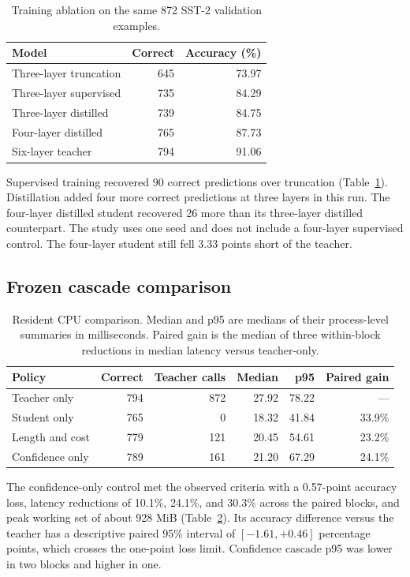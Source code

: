 \documentclass{article}
\begin{document}
\begin{table}[H]
\centering
\caption{Training ablation on the same 872 SST-2 validation examples.}
\label{tab:student}
\begin{tabular}{lrr}
\toprule Model & Correct & Accuracy (\%)\\
\midrule
Three-layer truncation & 645 & 73.97\\
Three-layer supervised & 735 & 84.29\\
Three-layer distilled & 739 & 84.75\\
Four-layer distilled & 765 & 87.73\\
Six-layer teacher & 794 & 91.06\\
\bottomrule
\end{tabular}
\end{table}
Supervised training recovered 90 correct predictions over truncation (Table~\ref{tab:student}). Distillation added four more correct predictions at three layers in this run. The four-layer distilled student recovered 26 more than its three-layer distilled counterpart. The study uses one seed and does not include a four-layer supervised control. The four-layer student still fell 3.33 points short of the teacher.

\subsection{Frozen cascade comparison}
\begin{table}[H]
\centering
\caption{Resident CPU comparison. Median and p95 are medians of their process-level summaries in milliseconds. Paired gain is the median of three within-block reductions in median latency versus teacher-only.}
\label{tab:cascade}
\begin{tabular}{lrrrrr}
\toprule Policy & Correct & Teacher calls & Median & p95 & Paired gain\\
\midrule
Teacher only & 794 & 872 & 27.92 & 78.22 & ---\\
Student only & 765 & 0 & 18.32 & 41.84 & 33.9\%\\
Length and cost & 779 & 121 & 20.45 & 54.61 & 23.2\%\\
Confidence only & 789 & 161 & 21.20 & 67.29 & 24.1\%\\
\bottomrule
\end{tabular}
\end{table}
The confidence-only control met the observed criteria with a 0.57-point accuracy loss, latency reductions of 10.1\%, 24.1\%, and 30.3\% across the paired blocks, and peak working set of about 928 MiB (Table~\ref{tab:cascade}). Its accuracy difference versus the teacher has a descriptive paired 95\% interval of \([-1.61,+0.46]\) percentage points, which crosses the one-point loss limit. Confidence cascade p95 was lower in two blocks and higher in one.
\end{document}
